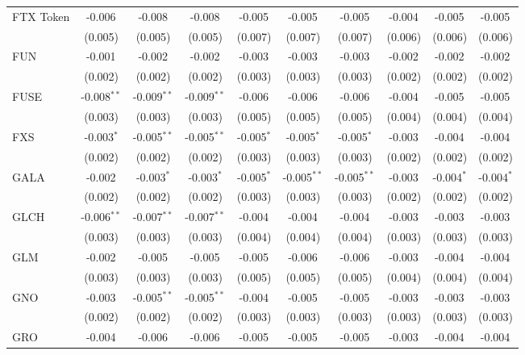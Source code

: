 \begin{table}[!htbp]
\begin{tabular}{@{\extracolsep{5pt}}lccccccccc}
 FTX Token & -0.006$^{}$ & -0.008$^{}$ & -0.008$^{}$ & -0.005$^{}$ & -0.005$^{}$ & -0.005$^{}$ & -0.004$^{}$ & -0.005$^{}$ & -0.005$^{}$ \\
  & (0.005) & (0.005) & (0.005) & (0.007) & (0.007) & (0.007) & (0.006) & (0.006) & (0.006) \\
 FUN & -0.001$^{}$ & -0.002$^{}$ & -0.002$^{}$ & -0.003$^{}$ & -0.003$^{}$ & -0.003$^{}$ & -0.002$^{}$ & -0.002$^{}$ & -0.002$^{}$ \\
  & (0.002) & (0.002) & (0.002) & (0.003) & (0.003) & (0.003) & (0.002) & (0.002) & (0.002) \\
 FUSE & -0.008$^{**}$ & -0.009$^{**}$ & -0.009$^{**}$ & -0.006$^{}$ & -0.006$^{}$ & -0.006$^{}$ & -0.004$^{}$ & -0.005$^{}$ & -0.005$^{}$ \\
  & (0.003) & (0.003) & (0.003) & (0.005) & (0.005) & (0.005) & (0.004) & (0.004) & (0.004) \\
 FXS & -0.003$^{*}$ & -0.005$^{**}$ & -0.005$^{**}$ & -0.005$^{*}$ & -0.005$^{*}$ & -0.005$^{*}$ & -0.003$^{}$ & -0.004$^{}$ & -0.004$^{}$ \\
  & (0.002) & (0.002) & (0.002) & (0.003) & (0.003) & (0.003) & (0.002) & (0.002) & (0.002) \\
 GALA & -0.002$^{}$ & -0.003$^{*}$ & -0.003$^{*}$ & -0.005$^{*}$ & -0.005$^{**}$ & -0.005$^{**}$ & -0.003$^{}$ & -0.004$^{*}$ & -0.004$^{*}$ \\
  & (0.002) & (0.002) & (0.002) & (0.003) & (0.003) & (0.003) & (0.002) & (0.002) & (0.002) \\
 GLCH & -0.006$^{**}$ & -0.007$^{**}$ & -0.007$^{**}$ & -0.004$^{}$ & -0.004$^{}$ & -0.004$^{}$ & -0.003$^{}$ & -0.003$^{}$ & -0.003$^{}$ \\
  & (0.003) & (0.003) & (0.003) & (0.004) & (0.004) & (0.004) & (0.003) & (0.003) & (0.003) \\
 GLM & -0.002$^{}$ & -0.005$^{}$ & -0.005$^{}$ & -0.005$^{}$ & -0.006$^{}$ & -0.006$^{}$ & -0.003$^{}$ & -0.004$^{}$ & -0.004$^{}$ \\
  & (0.003) & (0.003) & (0.003) & (0.005) & (0.005) & (0.005) & (0.004) & (0.004) & (0.004) \\
 GNO & -0.003$^{}$ & -0.005$^{**}$ & -0.005$^{**}$ & -0.004$^{}$ & -0.005$^{}$ & -0.005$^{}$ & -0.003$^{}$ & -0.003$^{}$ & -0.003$^{}$ \\
  & (0.002) & (0.002) & (0.002) & (0.003) & (0.003) & (0.003) & (0.003) & (0.003) & (0.003) \\
 GRO & -0.004$^{}$ & -0.006$^{}$ & -0.006$^{}$ & -0.005$^{}$ & -0.005$^{}$ & -0.005$^{}$ & -0.003$^{}$ & -0.004$^{}$ & -0.004$^{}$ \\

\end{tabular}
\end{table}
